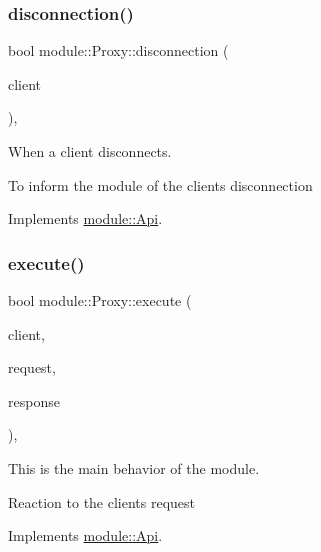 \subsubsection{\texorpdfstring{disconnection()}{disconnection()}}
{\footnotesize\ttfamily bool module\+::\+Proxy\+::disconnection (\begin{DoxyParamCaption}\item[{const \hyperlink{structnet_1_1IClient}{net\+::\+I\+Client} \&}]{client }\end{DoxyParamCaption})\hspace{0.3cm}{\ttfamily [virtual]}, {\ttfamily [noexcept]}}



When a client disconnects. 

To inform the module of the client\textquotesingle{}s disconnection 

Implements \hyperlink{structmodule_1_1Api_a8aa98bd4094fb13916e100509a948763}{module\+::\+Api}.

\mbox{\label{classmodule_1_1Proxy_a7a210c144da81f379a7ca6b7ef7914c8}} 
\subsubsection{\texorpdfstring{execute()}{execute()}}
{\footnotesize\ttfamily bool module\+::\+Proxy\+::execute (\begin{DoxyParamCaption}\item[{const \hyperlink{structnet_1_1IClient}{net\+::\+I\+Client} \&}]{client,  }\item[{\hyperlink{structhttp_1_1IRequest}{http\+::\+I\+Request} \&}]{request,  }\item[{\hyperlink{structhttp_1_1IResponse}{http\+::\+I\+Response} \&}]{response }\end{DoxyParamCaption})\hspace{0.3cm}{\ttfamily [virtual]}, {\ttfamily [noexcept]}}



This is the main behavior of the module. 

Reaction to the client\textquotesingle{}s request 

Implements \hyperlink{structmodule_1_1Api_afd1f5243a90811d06d96f725490bcba6}{module\+::\+Api}.

\mbox{\label{classmodule_1_1Proxy_a92e33605f1164599922fa64d936f5b77}} 
